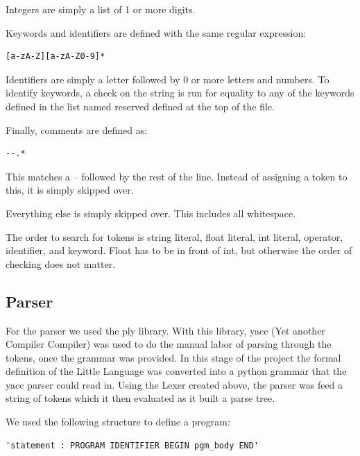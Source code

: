\documentclass[12pt]{article}
\begin{document}
                Integers are simply a list of 1 or more digits.

                Keywords and identifiers are defined with the same regular expression:

                \begin{verbatim}
[a-zA-Z][a-zA-Z0-9]*
                \end{verbatim}

                Identifiers are simply a letter followed by 0 or more letters and numbers. To identify keywords, a check on the string is run for equality to any of the keywords defined in the list named reserved defined at the top of the file.

                Finally, comments are defined as:

                \begin{verbatim}
--.*
                \end{verbatim}

                This matches a -- followed by the rest of the line. Instead of assigning a token to this, it is simply skipped over.

                Everything else is simply skipped over. This includes all whitespace.

                The order to search for tokens is string literal, float literal, int literal, operator, identifier, and keyword. Float has to be in front of int, but otherwise the order of checking does not matter.




        \subsection{Parser}
            For the parser we used the ply library.  With this library, yacc (Yet another Compiler Compiler) was used to do the manual labor of parsing through the tokens, once the grammar was provided.   In this stage of the project the formal definition of the Little Language was converted into a python grammar that the yacc parser could read in.  Using the Lexer created above, the parser was feed a string of tokens which it then evaluated as it built a parse tree.  
            
            We used the following structure to define a program: 
            \begin{verbatim}
'statement : PROGRAM IDENTIFIER BEGIN pgm_body END'
           \end{verbatim}
           
\end{document}
